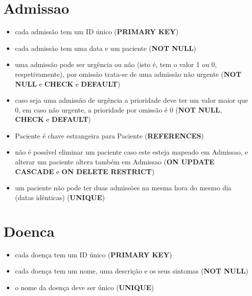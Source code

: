 \documentclass[article, a4paper, 12pt, oneside]{memoir}
\begin{document}
\section*{Admissao}
\begin{itemize}
	\item cada admissão tem um ID único (\textbf{PRIMARY KEY})
	\item cada admissão tem uma data e um paciente (\textbf{NOT NULL})
	\item uma admissão pode ser urgência ou não (isto é, tem o valor 1 ou 0, respetivamente), por omissão trata-se de uma admissão não urgente (\textbf{NOT NULL} e \textbf{CHECK} e \textbf{DEFAULT})
	\item caso seja uma admissão de urgência a prioridade deve ter um valor maior que 0, em caso não urgente, a prioridade por omissão é 0 (\textbf{NOT NULL}, \textbf{CHECK} e \textbf{DEFAULT})
	\item Paciente é chave estrangeira para Paciente (\textbf{REFERENCES})
	\item não é possível eliminar um paciente caso este esteja mapeado em Admissao, e alterar um paciente altera também em Admissao (\textbf{ON UPDATE CASCADE} e \textbf{ON DELETE RESTRICT})
	\item um paciente não pode ter duas admissões na mesma hora do mesmo dia (datas idênticas) (\textbf{UNIQUE})
\end{itemize}

\section*{Doenca}
\begin{itemize}
	\item cada doença tem um ID único (\textbf{PRIMARY KEY})
	\item cada doença tem um nome, uma descrição e os seus sintomas (\textbf{NOT NULL})
	\item o nome da doença deve ser único (\textbf{UNIQUE})
\end{itemize}
\end{document}
